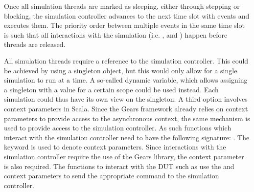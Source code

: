 Once all simulation threads are marked as sleeping, either through stepping or blocking, the simulation controller
advances to the next time slot with events and executes them. The priority order between multiple events in the same
time slot is such that all interactions with the simulation (i.e. ,  and )
happen before threads are released.


All simulation threads require a reference to the simulation controller. This could be achieved by using a singleton
object, but this would only allow for a single simulation to run at a time. A so-called dynamic variable, which
allows assigning a singleton with a value for a certain scope could be used instead. Each simulation could thus have
its own view on the singleton. A third option involves context parameters in Scala. Since the Gears framework already
relies on context parameters to provide access to the asynchronous context, the same mechanism is used to provide
access to the simulation controller. As such functions which interact with the simulation controller need to have the
following signature: . The  keyword is used to denote context
parameters. Since interactions with the simulation controller require the use of the Gears library, the 
context parameter is also required. The functions to interact with the DUT such as  use the
 and  context parameters to send the appropriate command to the simulation controller.

